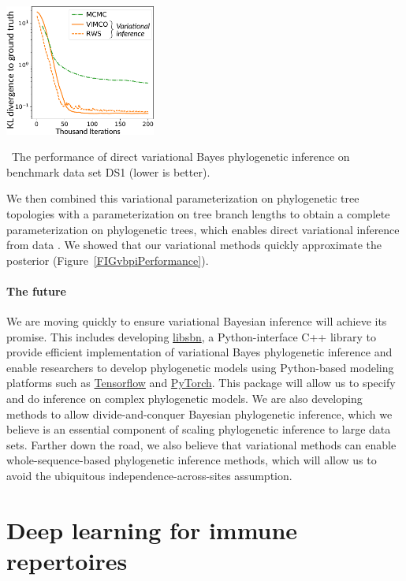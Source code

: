 \documentclass[nobib]{tufte-handout}
\begin{document}
\begin{marginfigure}[0.7in]%
  \includegraphics[width=1.95in]{vbpi-performance}
  \caption{\
    The performance of direct variational Bayes phylogenetic inference on benchmark data set DS1 (lower is better).
    }
  \label{FIGvbpiPerformance}
\end{marginfigure}%

We then combined this variational parameterization on phylogenetic tree topologies with a parameterization on tree branch lengths to obtain a complete parameterization on phylogenetic trees, which enables direct variational inference from data \cite{Zhang2018-lw}.
We showed that our variational methods quickly approximate the posterior (Figure~\ref{FIGvbpiPerformance}).

\paragraph{The future}
We are moving quickly to ensure variational Bayesian inference will achieve its promise.
This includes developing \href{https://github.com/matsengrp/libsbn/}{libsbn}, a Python-interface C++ library to provide efficient implementation of variational Bayes phylogenetic inference and enable researchers to develop phylogenetic models using Python-based modeling platforms such as \href{https://www.tensorflow.org/}{Tensorflow} and \href{https://pytorch.org/}{PyTorch}.
This package will allow us to specify and do inference on complex phylogenetic models.
We are also developing methods to allow divide-and-conquer Bayesian phylogenetic inference, which we believe is an essential component of scaling phylogenetic inference to large data sets.
Farther down the road, we also believe that variational methods can enable whole-sequence-based phylogenetic inference methods, which will allow us to avoid the ubiquitous independence-across-sites assumption.


\vspace{0.3cm}
\section{Deep learning for immune repertoires}
\vspace{-0.3cm}
\end{document}
